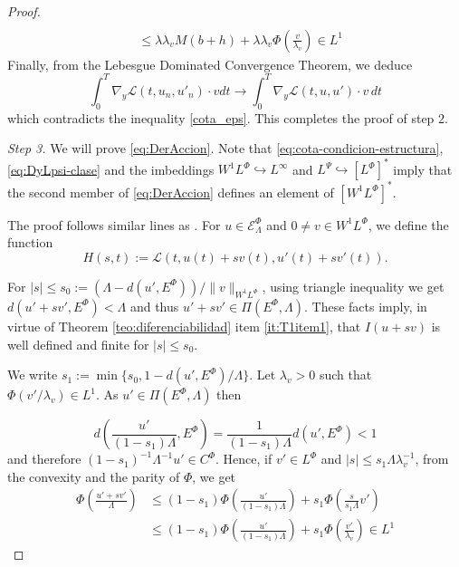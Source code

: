 \documentclass[twoside]{article}
\theoremstyle{remark}
\newcommand{\lphi}{L^{\Phi}}
\newcommand{\lpsi}{L^{\Psi}}
\newcommand{\ephi}{E^{\Phi}}
\newcommand{\wphi}{W^{1}\lphi}
\newcommand{\sobnor}{\|_{W^{1}\lphi}}
\newcommand{\domi}{\mathcal{E}^{\Phi}}
\renewcommand{\leq}{\leqslant}
\begin{document}
\begin{proof}
\begin{equation}
\begin{split}
\\
&\leq \lambda\lambda_v M (b+h)+\lambda\lambda_v  \Phi\left(\frac{v}{\lambda_v}\right)\in L^1
\end{split}
\end{equation}
  Finally, from the Lebesgue Dominated Convergence Theorem, we deduce
\begin{equation}\label{conv_debil}
\int_0^T  \nabla_y\mathcal{L}(t,u_{n},u'_{n})
\cdot  v dt
\to 
\int_0^T \nabla_y\mathcal{L}(t,u,u')\cdot v\, dt \end{equation}
which contradicts the inequality \eqref{cota_eps}. This completes the proof of step 2.

\emph{Step 3.} We will prove \eqref{eq:DerAccion}. 
 Note that \eqref{eq:cota-condicion-estructura},  \eqref{eq:DyLpsi-clase} and the imbeddings $\wphi \hookrightarrow L^{\infty}$ and  
$\lpsi\hookrightarrow  \left[\lphi\right]^*$ imply that the second member of
\eqref{eq:DerAccion} defines an element of $\left[\wphi\right]^*$.

The proof follows similar lines as \cite[Thm. 1.4]{mawhin2010critical}. 
For $u\in \domi_{\Lambda}$ and $0\neq v\in\wphi$, we define the function
\[H(s,t):=\mathcal{L}(t,u(t)+s v(t),u'(t)+sv'(t)).\]



For  $|s|\leq s_0:=\left(\Lambda-d(u',\ephi)\right)/\|v\sobnor$, 
using triangle inequality we get 
$
d \left(u'+s v', \ephi \right)<\Lambda$ and thus $u'+sv' \in \Pi(\ephi,\Lambda)$. 
These facts imply, in virtue of Theorem \ref{teo:diferenciabilidad} item \ref{it:T1item1}, 
that $I(u+s v)$ is well defined and finite for $|s|\leq s_0$. 



We write $s_1:=\min\{s_0,1-d(u',\ephi)/\Lambda\}$. Let $\lambda_v>0$ such that $\Phi(v'/\lambda_v)\in L^1$. As $u'\in\Pi(\ephi,\Lambda)$ then

\[
d\left(\frac{u'}{(1-s_1)\Lambda},E^{\Phi}\right)=\frac{1}{(1-s_1)\Lambda}d(u', E^{\Phi})<1
\]
and therefore $(1-s_1)^{-1}\Lambda^{-1}u'\in C^\Phi$. Hence,  if $v'\in\lphi$ and $|s|\leq s_1 \Lambda\lambda_v^{-1}$, from the convexity and the parity of $\Phi$, we get
\begin{equation}\label{eq:cota-u+sv}
\begin{split}
\Phi\left(\frac{u'+sv'}{\Lambda}\right)&
\leq
(1-s_1)\Phi\left(\frac{u'}{(1-s_1)\Lambda}\right)+s_1 \Phi\left(\frac{s}{s_1\Lambda}v'\right)
\\
&\leq
(1-s_1)\Phi\left(\frac{u'}{(1-s_1)\Lambda}\right)+s_1 \Phi\left(\frac{v'}{\lambda_v}\right)
\in L^1
\end{split}
\end{equation}




\end{proof}
\end{document}
